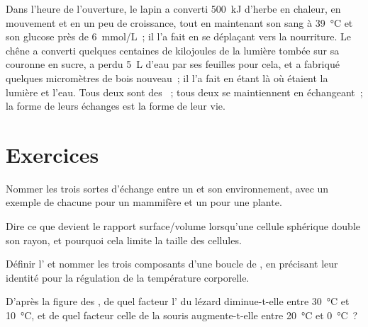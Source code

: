 \begin{example}\label{ex:b1:organism-environment:budgets}
Dans l'heure de l'ouverture, le lapin a converti \qty{500}{kJ} d'herbe
en chaleur, en mouvement et en un peu de croissance, tout en maintenant
son sang à \qty{39}{\celsius} et son glucose près de \qty{6}{mmol/L}~;
il l'a fait en se déplaçant vers la nourriture. Le chêne a converti
quelques centaines de kilojoules de la lumière tombée sur sa couronne en
sucre, a perdu \qty{5}{L} d'eau par ses feuilles pour cela, et a fabriqué
quelques micromètres de bois nouveau~; il l'a fait en étant là où
étaient la lumière et l'eau. Tous deux sont des ~; tous
deux se maintiennent en échangeant~; la forme de leurs échanges est la
forme de leur vie.
\end{example}

\section{Exercices}

\begin{exercise}[$\star$]\label{exo:b1:organism-environment:1}
Nommer les trois sortes d'échange entre un  et son
environnement, avec un exemple de chacune pour un mammifère et un pour
une plante.
\end{exercise}

\begin{exercise}[$\star$]\label{exo:b1:organism-environment:2}
Dire ce que devient le rapport surface/volume lorsqu'une cellule
sphérique double son rayon, et pourquoi cela limite la taille des
cellules.
\end{exercise}

\begin{exercise}[$\star$]\label{exo:b1:organism-environment:3}
Définir l' et nommer les trois composants d'une boucle de
, en précisant leur identité pour la régulation de
la température corporelle.
\end{exercise}

\begin{exercise}[$\star$]\label{exo:b1:organism-environment:4}
D'après la figure des , de quel facteur
l' du lézard diminue-t-elle entre
\qty{30}{\celsius} et \qty{10}{\celsius}, et de quel facteur celle de la
souris augmente-t-elle entre \qty{20}{\celsius} et \qty{0}{\celsius}~?
\end{exercise}


